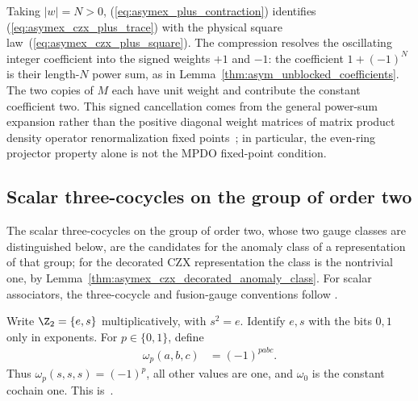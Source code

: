 Taking $|w|=N>0$, (\ref{eq:asymex_plus_contraction}) identifies
(\ref{eq:asymex_czx_plus_trace}) with the physical square
law~(\ref{eq:asymex_czx_plus_square}). The compression resolves the
oscillating integer coefficient into the signed weights $+1$ and $-1$:
the coefficient $1+(-1)^N$ is their length-$N$ power sum, as in
Lemma~\ref{thm:asym_unblocked_coefficients}. The two copies of $M$
each have unit weight and contribute the constant coefficient two.
This signed cancellation comes from the general power-sum expansion rather
than the positive diagonal weight matrices of matrix product density operator
renormalization fixed points~\cite[Theorem~4.14(ii)]{Cirac2016MPDO_arXiv}; in
particular, the even-ring projector property alone is not the MPDO fixed-point
condition.

\subsection{Scalar three-cocycles on the group of order two}

The scalar three-cocycles on the group of order two, whose two gauge
classes are distinguished below, are the candidates for the anomaly class
of a representation of that group; for the decorated CZX representation
the class is the nontrivial one, by
Lemma~\ref{thm:asymex_czx_decorated_anomaly_class}. For scalar associators,
the three-cocycle and fusion-gauge conventions follow
\cite{GarreRubioSchuch2024DomainWall}.

\begin{definition}
    \label{def:asymex_z2_cocycles}
    \leanok
    Write $\Z_2=\{e,s\}$ multiplicatively, with $s^2=e$.
    Identify $e,s$ with the bits $0,1$ only in exponents.
    For $p\in\{0,1\}$, define
    \begin{align}
        \omega_p(a,b,c) & =(-1)^{pabc}.
    \end{align}
    Thus $\omega_p(s,s,s)=(-1)^p$, all other values are one,
    and $\omega_0$ is the constant cochain one.
    This is~\cite[``Two scalar three-cochains'']{QICLean2026Blueprint}.
\end{definition}

